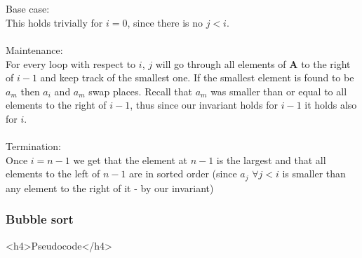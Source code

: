 \\\\
Base case:\\
This holds trivially for $i=0$, since there is no $j< i$.
\\\\
Maintenance:\\
For every loop with respect to $i$, $j$ will go through all elements of $\mathbf A$
to the right of $i-1$ and keep track of the smallest one. If the smallest element
is found to be $a_m$ then $a_i$ and $a_m$ swap places. Recall that $a_m$ was smaller
than or equal to all elements to the right of $i-1$, thus since our invariant holds
for $i-1$ it holds also for $i$.
\\\\
Termination:\\
Once $i=n-1$ we get that the element at $n-1$ is the largest and that all elements to the
left of $n-1$ are in sorted order (since $a_j$ $\forall j< i$ is smaller than any element 
to the right of it - by our invariant)

\subsubsection{Bubble sort}
<h4>Pseudocode</h4>

